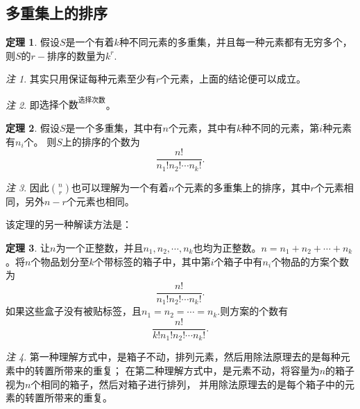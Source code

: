\documentclass[a4paper,11pt]{article}%
\theoremstyle{remark}
\newtheorem*{remark}{注}
\theoremstyle{remark}
\theoremstyle{definition}
\newtheorem{theorem}{定理}[section]
\theoremstyle{definition}
\theoremstyle{definition}
\begin{document}
\subsection{多重集上的排序}
\begin{theorem}
    假设$S$是一个有着$k$种不同元素的多重集，并且每一种元素都有无穷多个，则$S$的$r-$排序的数量为$k^r$.
\end{theorem}
\begin{remark}
    其实只用保证每种元素至少有$r$个元素，上面的结论便可以成立。
\end{remark}
\begin{remark}
    即$\text{选择个数}^{\text{选择次数}}$。
\end{remark}
\begin{theorem}
    假设$S$是一个多重集，其中有$n$个元素，其中有$k$种不同的元素，第$i$种元素有$n_i$个。
    则$S$上的排序的个数为
    \[\frac{n!}{n_1!n_2!\cdots n_k!}.\]
\end{theorem}
\begin{remark}
    因此$\binom{n}{r}$也可以理解为一个有着$n$个元素的多重集上的排序，其中$r$个元素相同，另外$n-r$个元素也相同。
\end{remark}
该定理的另一种解读方法是：
\begin{theorem}
    让$n$为一个正整数，并且$n_1,n_2,\cdots,n_k$也均为正整数。$n=n_1+n_2+\cdots+n_k$。将$n$个物品划分至$k$个带标签的箱子中，其中第$i$个箱子中有$n_i$个物品的方案个数
    为
    \[\frac{n!}{n_1!n_2!\cdots n_k!}.\]
    如果这些盒子没有被贴标签，且$n_1=n_2=\cdots=n_k$.则方案的个数有
    \[\frac{n!}{k!n_1!n_2!\cdots n_k!}.\]
\end{theorem}
\begin{remark}
    第一种理解方式中，是箱子不动，排列元素，然后用除法原理去的是每种元素中的转置所带来的重复；
    在第二种理解方式中，是元素不动，将容量为$n$的箱子视为$n$个相同的箱子，然后对箱子进行排列，
    并用除法原理去的是每个箱子中的元素的转置所带来的重复。
\end{remark}
\end{document}
